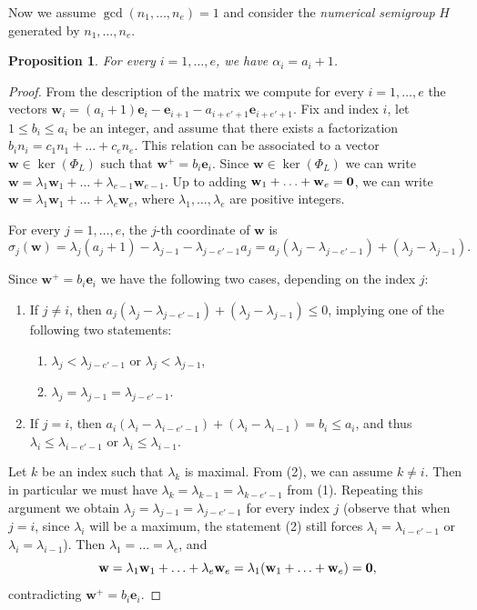 \documentclass[11pt,twoside]{amsart}
\def\bw{{\mathbf w}}
\def\be{{\mathbf e}}
\newtheorem{prop}[Theorem]{Proposition}
\theoremstyle{definition}
\numberwithin{equation}{section}
\begin{document}
Now we
assume $\gcd(n_1,\ldots,n_e)=1$ and
consider the \emph{numerical semigroup} $H$ generated by $n_1, \ldots, n_e$.
\begin{prop}\label{walpha}
    For every $i=1,\ldots,e$, we have $\alpha_i=a_i+1$.
\end{prop}
\begin{proof}
From the description of the matrix we compute for every $i=1,\ldots,e$ the vectors $\bw_i = (a_i+1)\be_i-\be_{i+1}-a_{i+e'+1}\be_{i+e'+1}$. Fix and index $i$, let $1 \le b_i \le a_i$ be an integer, and assume that  there exists a factorization $b_in_i = c_1n_1+\ldots+c_en_e$. This relation can be associated to a vector $\bw \in \ker(\Phi_L)$ such that $\bw^+=b_i\be_i$. Since $\bw \in \ker(\Phi_L)$ we can write $\bw = \lambda_1\bw_1+\ldots+\lambda_{e-1}\bw_{e-1}$. Up to adding $\bw_1+\ldots+\bw_e = {\bf 0}$, we can write $\bw = \lambda_1\bw_1+\ldots+\lambda_e\bw_e$, where $\lambda_1,\ldots,\lambda_e$ are positive integers.

For every $j = 1,\ldots,e$, the $j$-th coordinate of $\bw$ is $$\sigma_j(\bw)=\lambda_j(a_j+1)-\lambda_{j-1}-\lambda_{j-e'-1}a_j = a_j(\lambda_j-\lambda_{j-e'-1})+(\lambda_j-\lambda_{j-1}).$$

Since $\bw^+=b_i\be_i$ we have the following two cases, depending on the index $j$:
\begin{enumerate}
\item If $j \ne i$, then $a_j(\lambda_j-\lambda_{j-e'-1})+(\lambda_j-\lambda_{j-1}) \le 0$, implying one of the following two statements:
\begin{enumerate}
    \item $\lambda_j < \lambda_{j-e'-1}$ or $\lambda_j < \lambda_{j-1}$,
    \item $\lambda_j=\lambda_{j-1}=\lambda_{j-e'-1}$.
\end{enumerate}
\item If $j = i$, then $a_i(\lambda_i-\lambda_{i-e'-1})+(\lambda_i-\lambda_{i-1}) = b_i \le a_i$, and thus $\lambda_i \le \lambda_{i-e'-1}$ or $\lambda_i \le \lambda_{i-1}$.
\end{enumerate}

Let $k$ be an index such that $\lambda_k$ is maximal. From (2), we can assume $k \ne i$. Then in particular we must have $\lambda_k = \lambda_{k-1}=\lambda_{k-e'-1}$ from (1). Repeating this argument we obtain $\lambda_j = \lambda_{j-1}=\lambda_{j-e'-1}$ for every index $j$ (observe that when $j=i$, since $\lambda_i$ will be a maximum, the statement (2) still forces $\lambda_i=\lambda_{i-e'-1}$ or $\lambda_i=\lambda_{i-1}$). Then $\lambda_1=\ldots=\lambda_e$, and 
$$\bw = \lambda_1\bw_1+\ldots+\lambda_e\bw_e = \lambda_1(\bw_1+\ldots+\bw_e)={\bf 0},$$
contradicting $\bw^+=b_i\be_i$.
\end{proof}
\end{document}
